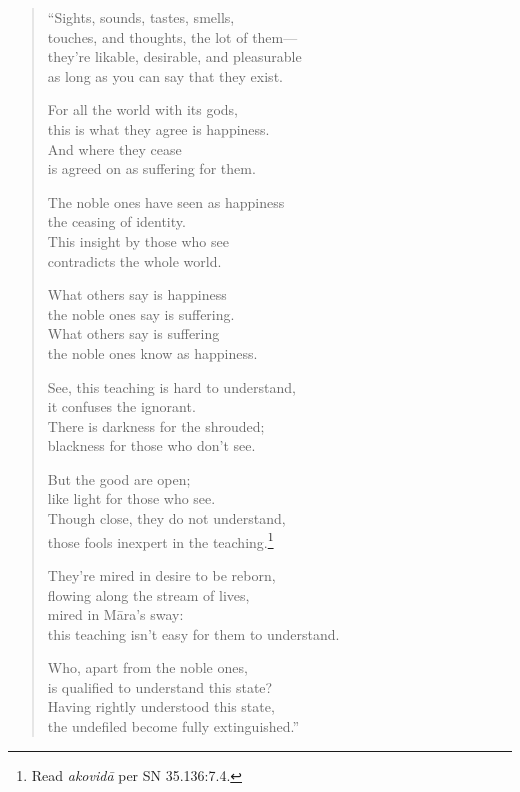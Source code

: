 \documentclass[12pt,openany]{book}%
\begin{document}
\begin{verse}%
“Sights, sounds, tastes, smells, \\
touches, and thoughts, the lot of them—\\
they’re likable, desirable, and pleasurable \\
as long as you can say that they exist. 

For all the world with its gods, \\
this is what they agree is happiness. \\
And where they cease \\
is agreed on as suffering for them. 

The noble ones have seen as happiness \\
the ceasing of identity. \\
This insight by those who see \\
contradicts the whole world. 

What others say is happiness \\
the noble ones say is suffering. \\
What others say is suffering \\
the noble ones know as happiness. 

See, this teaching is hard to understand, \\
it confuses the ignorant. \\
There is darkness for the shrouded; \\
blackness for those who don’t see. 

But the good are open; \\
like light for those who see. \\
Though close, they do not understand, \\
those fools inexpert in the teaching.\footnote{Read \textit{\textsanskrit{akovidā}} per SN 35.136:7.4. } 

They’re mired in desire to be reborn, \\
flowing along the stream of lives, \\
mired in \textsanskrit{Māra}’s sway: \\
this teaching isn’t easy for them to understand. 

Who, apart from the noble ones, \\
is qualified to understand this state? \\
Having rightly understood this state, \\
the undefiled become fully extinguished.” 

%
\end{verse}
\end{document}
